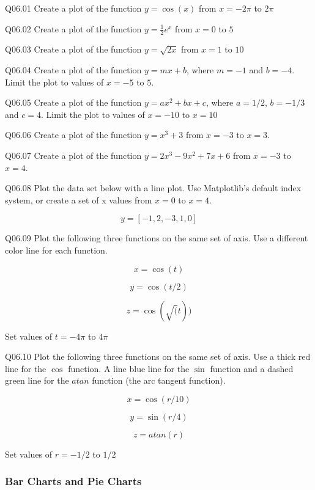 \documentclass{book}
\newenvironment{problems}{}{}  %
\begin{document}
    
        \begin{problems}
        Q06.01 Create a plot of the function \(y=\cos(x)\) from \(x = -2\pi\) to
\(2\pi\)

Q06.02 Create a plot of the function \(y=\frac{1}{2}{e^x}\) from
\(x = 0\) to \(5\)

Q06.03 Create a plot of the function \(y=\sqrt{2x}\) from \(x = 1\) to
\(10\)

Q06.04 Create a plot of the function \(y=mx+b\), where \(m=-1\) and
\(b=-4\). Limit the plot to values of \(x=-5\) to \(5\).

Q06.05 Create a plot of the function \(y=ax^2+bx+c\), where \(a=1/2\),
\(b=-1/3\) and \(c=4\). Limit the plot to values of \(x=-10\) to
\(x=10\)

Q06.06 Create a plot of the function \(y=x^3+3\) from \(x=-3\) to
\(x=3\).

Q06.07 Create a plot of the function \(y=2x^3-9x^2+7x+6\) from \(x=-3\)
to \(x=4\).

Q06.08 Plot the data set below with a line plot. Use Matplotlib's
default index system, or create a set of x values from \(x=0\) to
\(x = 4\).

\[ y = [-1, 2, -3, 1, 0] \]

Q06.09 Plot the following three functions on the same set of axis. Use a
different color line for each function.

\[ x = \cos(t) \]

\[ y = \cos(t/2) \]

\[ z = \cos(\sqrt(t)) \]

Set values of \(t=-4\pi\) to \(4\pi\)

Q06.10 Plot the following three functions on the same set of axis. Use a
thick red line for the \(\cos\) function. A line blue line for the
\(\sin\) function and a dashed green line for the \(atan\) function (the
arc tangent function).

\[ x = \cos(r/10) \]

\[ y = \sin(r/4) \]

\[ z = atan(r) \]

Set values of \(r=-1/2\) to \(1/2\)
        \end{problems}

    




    
        \subsubsection{Bar Charts and Pie
Charts}\label{bar-charts-and-pie-charts}
    
\end{document}
